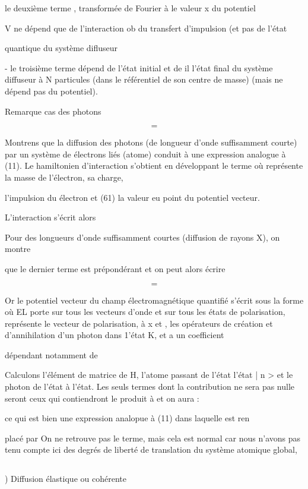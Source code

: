  le deuxième terme , transformée de Fourier à le valeur x du potentiel

V ne dépend que de l'interaction ob du transfert d'impulsion (et pas de l'état

quantique du système difluseur

- le troisième terme  dépend de l'état initial et de
il
l'état final du système diffuseur à N particules (dans le référentiel de son
centre de masse) (mais ne dépend pas du potentiel).

Remarque  cas des photons

\[
\tag{115}=
\]

Montrens que la diffusion des photons (de longueur d'onde suffisamment courte) par
un système de  électrons liés (atome) conduit à une expression analogue à (11).
Le hamiltonien d'interaction s'obtient en développant le terme
 où  représente la masse de l'électron,  sa charge, 

l'impulsion du électron et  (61) la valeur eu point  du potentiel
vecteur.

L'interaction s'écrit alors

Pour des longueurs d'onde suffisamment courtes (diffusion de rayons X), on montre

que le dernier terme est prépondérant et on peut alors écrire

\[
\tag{116}=
\]


Or le potentiel vecteur du champ électromagnétique quantifié s'écrit sous
la forme
où EL porte sur tous les vecteurs d'onde et  sur tous les états de polarisation,
représente le vecteur de polarisation, à x et , les opérateurs
de création et d'annihilation d'un photon dans 1'état K,  et a un coefficient

dépendant notamment de 

Calculons l'élément de matrice de H, l'atome passant de l'état
l'état | n > et le photon de l'état  à l'état.
Les seuls termes dont la contribution ne sera pas nulle seront ceux qui contiendront
le produit  à et on aura :

ce qui est bien une expression analopue à (11) dans laquelle  est ren

placé par On ne retrouve pas le terme, mais cela est
normal car nous n'avons pas tenu compte ici des degrés de liberté de translation
du système atomique global,

\subsection{}%
) Diffusion élastique ou cohérente

